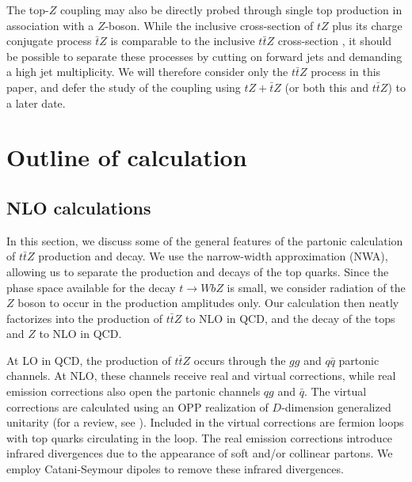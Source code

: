 \documentclass[preprint]{JHEP3} %
\def\ttbZ{t\bar{t}Z}
\begin{document}
The top-$Z$ coupling may also be directly probed through single top production in association with a $Z$-boson. While the inclusive cross-section of $tZ$ plus its charge conjugate process $\bar{t}Z$ is comparable to the inclusive $\ttbZ$ cross-section \cite{Campbell:2013yla}, it should be possible to separate these processes by cutting on forward jets and demanding a high jet multiplicity. We will therefore consider only the $\ttbZ$ process in this paper, and defer the study of the coupling using $tZ+\bar{t}Z$ (or both this and $\ttbZ$) to a later date.


\section{Outline of calculation}
\subsection{NLO calculations}
In this section, we discuss some of the general features of the partonic calculation of $\ttbZ$ production and decay. We use the narrow-width approximation (NWA), allowing us to separate the production and decays of the top quarks. Since the phase space available for the decay $t \to WbZ$ is small, we consider radiation of the $Z$ boson to occur in the production amplitudes only. Our calculation then neatly factorizes into the production of $\ttbZ$ to NLO in QCD, and the decay of the tops and $Z$ to NLO in QCD.

At LO in QCD, the production of $\ttbZ$ occurs through the $gg$ and $q\bar{q}$ partonic channels. At NLO, these channels receive real and virtual corrections, while real emission corrections also open the partonic channels $qg$ and $\bar{q}$. The virtual corrections are calculated using an OPP realization \cite{Ossola:2006} of  $D$-dimension generalized unitarity \cite{Ellis:2007br,Giele:2008ve,Ellis:2008ir} (for a review, see \cite{Ellis:2011}). Included in the virtual corrections are fermion loops with top quarks circulating in the loop. The real emission corrections introduce infrared divergences due to the appearance of soft and/or collinear partons. We employ Catani-Seymour dipoles \cite{Catani:1996vz,Catani:2002hc} to remove these infrared divergences. 
\end{document}
